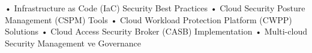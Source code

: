 • Infrastructure as Code (IaC) Security Best Practices
• Cloud Security Posture Management (CSPM) Tools
• Cloud Workload Protection Platform (CWPP) Solutions
• Cloud Access Security Broker (CASB) Implementation
• Multi-cloud Security Management ve Governance